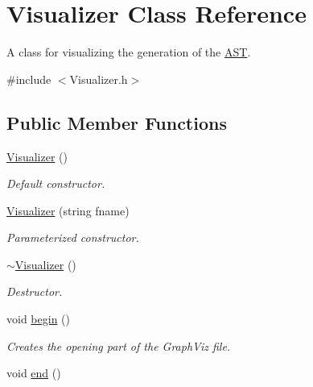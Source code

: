 \hypertarget{classVisualizer}{\section{Visualizer Class Reference}
\label{classVisualizer}
}


A class for visualizing the generation of the \hyperlink{classAST}{A\-S\-T}.  




{\ttfamily \#include $<$Visualizer.\-h$>$}

\subsection*{Public Member Functions}
\begin{DoxyCompactItemize}
\item 
\hyperlink{classVisualizer_a104487003c9fea602e26c072aae27efc}{Visualizer} ()
\begin{DoxyCompactList}\small\item\em Default constructor. \end{DoxyCompactList}\item 
\hyperlink{classVisualizer_a65d978447073196b110504d33bff34c5}{Visualizer} (string fname)
\begin{DoxyCompactList}\small\item\em Parameterized constructor. \end{DoxyCompactList}\item 
\hyperlink{classVisualizer_a013ec3101407fbe4805f289bc32d1265}{$\sim$\-Visualizer} ()
\begin{DoxyCompactList}\small\item\em Destructor. \end{DoxyCompactList}\item 
\hypertarget{classVisualizer_abf6c6d4ce88207fa564ad6238c263aca}{void \hyperlink{classVisualizer_abf6c6d4ce88207fa564ad6238c263aca}{begin} ()}\label{classVisualizer_abf6c6d4ce88207fa564ad6238c263aca}

\begin{DoxyCompactList}\small\item\em Creates the opening part of the Graph\-Viz file. \end{DoxyCompactList}\item 
\hypertarget{classVisualizer_a89da5b4fd09be3beac4c49067fa5cd73}{void \hyperlink{classVisualizer_a89da5b4fd09be3beac4c49067fa5cd73}{end} ()}\label{classVisualizer_a89da5b4fd09be3beac4c49067fa5cd73}


\end{DoxyCompactItemize}
